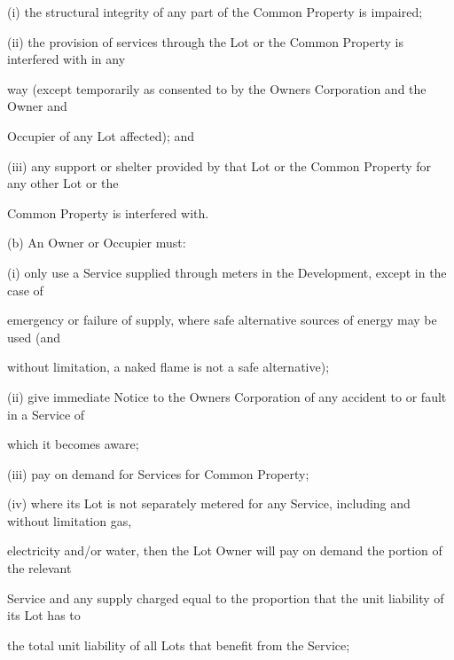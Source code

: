 \documentclass{article}
\begin{document}
{\fontsize{9.962}{1}(i) the structural integrity of any part of the Common Property is impaired; }

{\fontsize{9.962}{1}(ii) the provision of services through the Lot or the Common Property is interfered with in any }

{\fontsize{10.02}{1}way (except temporarily as consented to by the Owners Corporation and the Owner and }

{\fontsize{10.02}{1}Occupier of any Lot affected); and }

{\fontsize{9.962}{1}(iii) any support or shelter provided by that Lot or the Common Property for any other Lot or the }

{\fontsize{10.02}{1}Common Property is interfered with. }

{\fontsize{9.962}{1}(b) An Owner or Occupier must: }

{\fontsize{9.962}{1}(i) only use a Service supplied through meters in the Development, except in the case of }

{\fontsize{10.02}{1}emergency or failure of supply, where safe alternative sources of energy may be used (and }

{\fontsize{10.02}{1}without limitation, a naked flame is not a safe alternative); }

{\fontsize{9.962}{1}(ii) give immediate Notice to the Owners Corporation of any accident to or fault in a Service of }

{\fontsize{10.02}{1}which it becomes aware; }

{\fontsize{9.962}{1}(iii) pay on demand for Services for Common Property; }

{\fontsize{9.962}{1}(iv) where its Lot is not separately metered for any Service, including and without limitation gas, }

\newpage


















{\fontsize{10.02}{1}electricity and/or water, then the Lot Owner will pay on demand the portion of the relevant }

{\fontsize{10.02}{1}Service and any supply charged equal to the proportion that the unit liability of its Lot has to }

{\fontsize{10.02}{1}the total unit liability of all Lots that benefit from the Service; }
\end{document}
